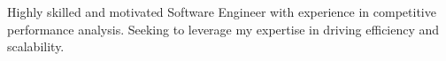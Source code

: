 

Highly skilled and motivated Software Engineer with experience in competitive performance analysis. Seeking to leverage my expertise in driving efficiency and scalability.
